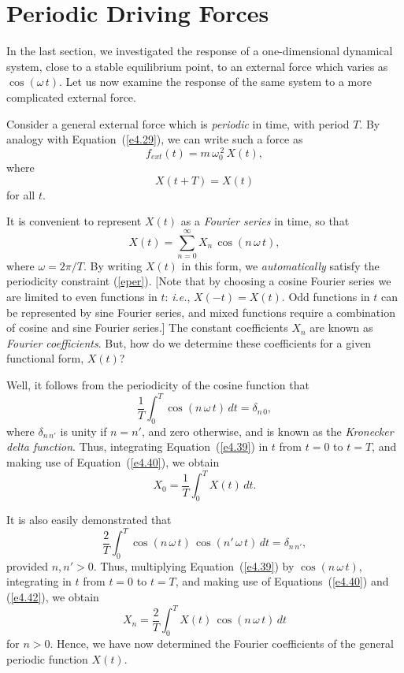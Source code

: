 \section{Periodic Driving Forces}
In the last section, we investigated the response of a one-dimensional dynamical system, close to a stable equilibrium point, 
to an external force which varies as $\cos(\omega\,t)$.  Let us
now examine the response of the same system to a more complicated
external force.

Consider a general external force which is {\em periodic} in time, with
period $T$. By analogy with Equation~(\ref{e4.29}), we can write such a 
force as
\begin{equation}\label{e4.37}
f_{ext}(t) = m\,\omega_0^{\,2}\,X(t),
\end{equation}
where
\begin{equation}\label{eper}
X(t+T) = X(t)
\end{equation}
for all $t$. 

It is convenient to represent $X(t)$ as a {\em Fourier series}\/ in time, so that
\begin{equation}\label{e4.39}
X(t) = \sum_{n=0}^{\infty} X_{n}\,\cos(n\,\omega\,t),
\end{equation}
where $\omega = 2\pi/T$. By writing $X(t)$ in this form, we {\em automatically}
satisfy the periodicity constraint (\ref{eper}). [Note that by choosing a cosine
Fourier series we are limited to even functions in $t$: {\em i.e.}, $X(-t)=X(t)$.
Odd functions in $t$ can be represented by sine Fourier series, and
mixed functions require a combination of cosine and sine Fourier series.]
 The constant coefficients
$X_n$ are known as  {\em Fourier coefficients}. But,
how do we determine these coefficients for a given functional form, $X(t)$?

Well, it follows from the periodicity of the cosine function that
\begin{equation}\label{e4.40}
\frac{1}{T} \int_0^T \cos (n\,\omega\,t)\,dt = \delta_{n\,0},
\end{equation}
where $\delta_{n\,n'}$ is unity if $n=n'$, and zero otherwise, and
is known as the {\em Kronecker delta function}. 
Thus, integrating Equation~(\ref{e4.39}) 
in $t$ from $t=0$ to $t=T$, and making use of Equation~(\ref{e4.40}),
we obtain
\begin{equation}\label{e4.41}
X_0 = \frac{1}{T}\int_0^T X(t) \,dt.
\end{equation}

It is also easily demonstrated that
\begin{equation}\label{e4.42}
\frac{2}{T} \int_0^T \cos(n\,\omega\,t)\,\cos(n'\,\omega\,t) \,dt= \delta_{n\,n'},
\end{equation}
provided $n, n'>0$. Thus, multiplying Equation~(\ref{e4.39}) by
$\cos(n\,\omega\,t)$, integrating in $t$ from $t=0$ to $t=T$, and
making use of Equations~(\ref{e4.40}) and (\ref{e4.42}), we obtain
\begin{equation}\label{e4.43}
X_n = \frac{2}{T} \int_0^T X(t)\,\cos(n\,\omega\,t)\,dt
\end{equation}
for $n>0$.  Hence, we have now determined the Fourier coefficients of
the general periodic function $X(t)$. 

